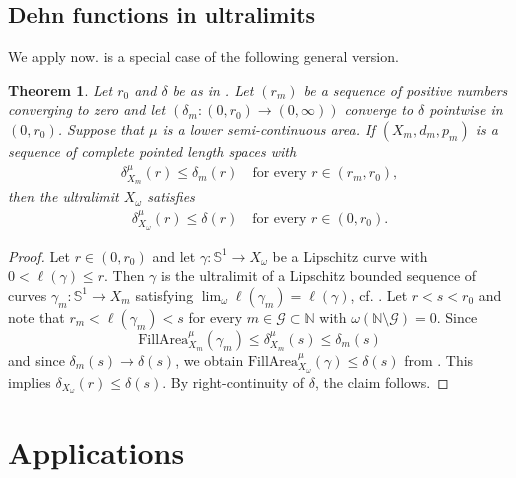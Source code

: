 \documentclass[a4paper,leqno]{amsart}
\numberwithin{equation}{section}
\newtheorem{theorem}{Theorem}[section]
\theoremstyle{remark}
\theoremstyle{remark}
\newcommand{\N}{\mathbb{N}}
\begin{document}
\subsection{Dehn functions in ultralimits}\label{section-dehn-function-in-ultralimits}
We apply  now.  is a special case of the following general version.%
\begin{theorem}\label{theorem-stability-dehn-function-coarse}
Let $r_0$ and $\delta$ be as in . Let $( r_m )$ be a sequence of positive numbers converging to zero and let $( \delta_m \colon (0,r_0) \to (0,\infty) )$ converge to $\delta$ pointwise in $(0,r_0)$. Suppose that $\mu$ is a lower semi-continuous area. If $( X_m, d_m, p_m )$ is a sequence of complete pointed length spaces with
\begin{align*}
    \delta_{X_m}^{\mu}(r) \leq \delta_m(r)
    \quad\text{for every $r \in (r_m,r_0)$},
\end{align*}
then the ultralimit $X_\omega$ satisfies
\begin{align*}
    \delta_{X_\omega}^{\mu}( r ) \leq \delta(r)
    \quad\text{for every $r \in (0,r_0)$.}
\end{align*}
\end{theorem}
\begin{proof}
Let $r\in(0,r_0)$ and let $\gamma \colon \mathbb{S}^1\rightarrow X_\omega$ be a Lipschitz curve with $0<\ell(\gamma)\leq r$. Then $\gamma$ is the ultralimit of a Lipschitz bounded sequence of curves $ \gamma_m \colon \mathbb{S}^1 \rightarrow X_m $ satisfying $\lim\nolimits_{\omega} \ell( \gamma_m ) = \ell( \gamma )$, cf. \cite[Corollary 2.6]{Lyt:Wen:You:20}. Let $r<s<r_0$ and note that $r_m<\ell(\gamma_m)<s$ for every $m \in \mathcal{G} \subset \N$ with $\omega( \N \setminus \mathcal{G} ) = 0$. Since $$\mathrm{FillArea}^{\mu}_{X_m}( \gamma_m ) \leq \delta_{X_m}^\mu(s) \leq \delta_m(s)$$ and since $\delta_m(s)\to\delta(s)$, we obtain $\mathrm{FillArea}^{\mu}_{X_\omega}(\gamma) \leq \delta(s)$ from . This implies $\delta_{X_\omega}(r) \leq \delta(s)$. By right-continuity of $\delta$, the claim follows.
\end{proof}



\section{Applications}\label{section-applications}
\end{document}
